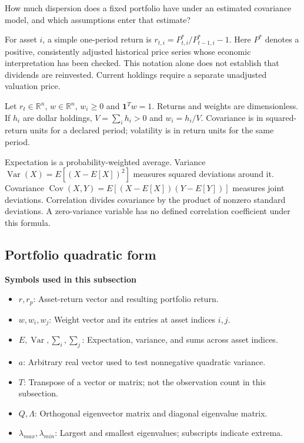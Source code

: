 \documentclass[
  american,
  11pt,
]{article}
\begin{document}
How much dispersion does a fixed portfolio have under an estimated
covariance model, and which assumptions enter that estimate?

For asset \(i\), a simple one-period return is
\(r_{t,i}=P^*_{t,i}/P^*_{t-1,i}-1\). Here \(P^*\) denotes a positive,
consistently adjusted historical price series whose economic
interpretation has been checked. This notation alone does not establish
that dividends are reinvested. Current holdings require a separate
unadjusted valuation price.

Let \(r_t\in\mathbb R^n\), \(w\in\mathbb R^n\), \(w_i\ge0\) and
\(\mathbf1^Tw=1\). Returns and weights are dimensionless. If \(h_i\) are
dollar holdings, \(V=\sum_i h_i>0\) and \(w_i=h_i/V\). Covariance is in
squared-return units for a declared period; volatility is in return
units for the same period.

Expectation is a probability-weighted average. Variance
\(\operatorname{Var}(X)=E[(X-E[X])^2]\) measures squared deviations
around it. Covariance \(\operatorname{Cov}(X,Y)=E[(X-E[X])(Y-E[Y])]\)
measures joint deviations. Correlation divides covariance by the product
of nonzero standard deviations. A zero-variance variable has no defined
correlation coefficient under this formula.

\subsection{Portfolio quadratic form}\label{portfolio-quadratic-form}

\textbf{Symbols used in this subsection}
\begin{itemize}
\item \(r,r_p\): Asset-return vector and resulting portfolio return.
\item \(w,w_i,w_j\): Weight vector and its entries at asset indices $i,j$.
\item \(E,\operatorname{Var},\sum_i,\sum_j\): Expectation, variance, and sums across asset indices.
\item \(a\): Arbitrary real vector used to test nonnegative quadratic variance.
\item \(T\): Transpose of a vector or matrix; not the observation count in this subsection.
\item \(Q,\Lambda\): Orthogonal eigenvector matrix and diagonal eigenvalue matrix.
\item \(\lambda_{max},\lambda_{min}\): Largest and smallest eigenvalues; subscripts indicate extrema.
\end{itemize}
\end{document}
